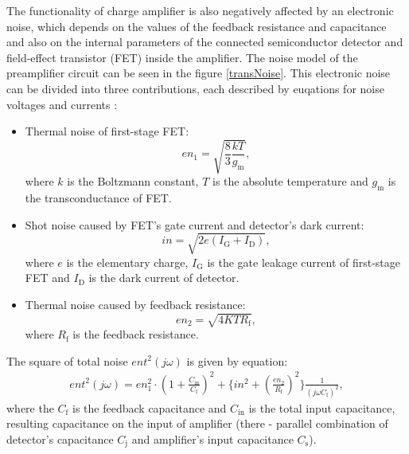 The functionality of charge amplifier is also negatively affected by an electronic noise, which depends on the values of the feedback resistance and capacitance and also on the internal parameters of the connected semiconductor detector and field-effect transistor (FET) inside the amplifier. The noise model of the preamplifier circuit can be seen in the figure \ref{transNoise}. This electronic noise can be divided into three contributions, each described by euqations for noise voltages and currents \cite{charge}:

\begin{itemize}
\item Thermal noise of first-stage FET:
\begin{equation}
en_1 = \sqrt{\frac{8}{3}\frac{kT}{g_{\textrm{m}}}},
\end{equation}
where $k$ is the Boltzmann constant, $T$ is the absolute temperature and $g_{\textrm{m}}$ is the transconductance of FET.
\item Shot noise caused by FET's gate current and detector's dark current:
\begin{equation}
in = \sqrt{2e(I_{\textrm{G}} + I_{\textrm{D}})},
\end{equation}
where $e$ is the elementary charge, $I_{\textrm{G}}$ is the gate leakage current of first-stage FET and $I_{\textrm{D}}$ is the dark current of detector.
\item Thermal noise caused by feedback resistance: 
\begin{equation}
en_2 = \sqrt{4KTR_{\textrm{f}}},
\end{equation}
where $R_{\textrm{f}}$ is the feedback resistance.
\end{itemize}
The square of total noise $ent^2(j \omega)$ is given by equation:
\begin{equation}
\begin{aligned}
ent^2(j \omega) = en_1^2 \cdot (1+\frac{C_{\textrm{in}}}{C_{\textrm{f}}})^2 + \{in^2 + (\frac{en_2}{R_{\textrm{f}}})^2 \}\frac{1}{(j \omega C_{\textrm{f}})^2},
\end{aligned}
\label{finalNoise}
\end{equation}
where the $C_{\textrm{f}}$ is the feedback capacitance and $C_{\textrm{in}}$ is the total input capacitance, resulting capacitance on the input of amplifier (there - parallel combination of detector's capacitance $C_{\textrm{j}}$ and amplifier's input capacitance $C_{\textrm{s}}$).   
